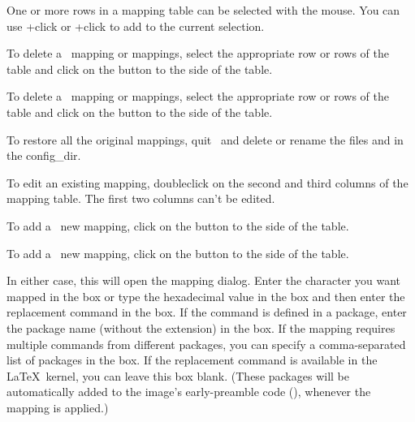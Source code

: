 One or more rows in a mapping table can be selected with the mouse.
You can use +\gls{click} or 
+\gls{click} to add to the
current selection.


To delete a \textmode\ mapping or mappings, select the appropriate row or rows of the
 table and click on the
 button
to the side of the table. 


To delete a \mathsmode\ mapping or mappings, select the appropriate row or rows of the
 table and click on the
 button
to the side of the table. 

To restore all the original mappings, quit \FlowframTk\ and delete
or rename the files  and
 in the \gls{config_dir}.

To edit an existing mapping, \gls{doubleclick} on the second and
third columns of the mapping table. The first two columns can't be
edited.

To add a \textmode\ new mapping, \gls{click} on the
 button to the
side of the  table. 

To add a \mathsmode\ new mapping, \gls{click} on the
 button to the
side of the  table. 


In either case, this will open the  mapping
dialog. Enter the character you want mapped in the
 box or type the hexadecimal value in the
 box and then enter the replacement
command in the  box.  If the command is
defined in a package, enter the package name (without the 
extension) in the  box. If the mapping
requires multiple commands from different packages, you can specify
a comma-separated list of packages in the
 box. If the replacement command is
available in the \LaTeX\ kernel, you can leave this box blank.
(These packages will be automatically added to the
image's \gls{early-preamble} code (), whenever the
mapping is applied.)

